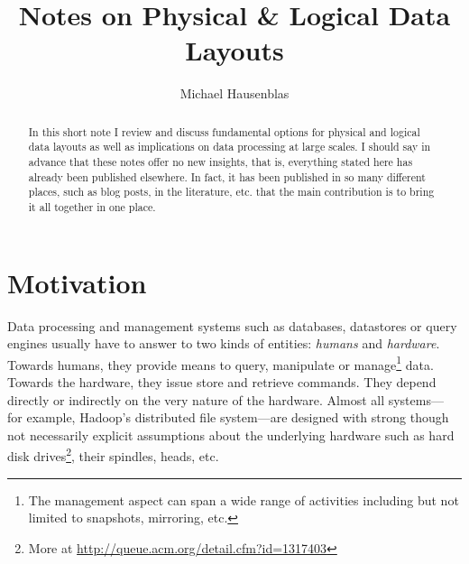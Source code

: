 \documentclass{llncs}
\begin{document}
\title{Notes on Physical \& Logical Data Layouts}
	\author{
	Michael Hausenblas 
	}
\maketitle

\begin{abstract}
In this short note I review and discuss fundamental options for physical and
logical data layouts as well as implications on data processing at large scales.
I should say in advance that these notes offer no new insights, that is, 
everything stated here has already been published elsewhere. In fact, it has
been published in so many different places, such as blog posts, in the 
literature, etc. that the main contribution is to bring it all together in one
place.
\end{abstract}

\section{Motivation}
\label{sec:mot}
Data processing and management systems such as databases, datastores or query 
engines usually have to answer to two kinds of entities: \emph{humans} and 
\emph{hardware}. 
Towards humans, they provide means to query, manipulate or 
manage\footnote{The management aspect can span a wide range of activities 
including but not limited to snapshots, mirroring, etc.} data.
Towards the hardware, they issue store and retrieve commands. They depend 
directly or indirectly on the very nature of the hardware. Almost all systems---
for example, Hadoop's distributed file system---are designed with strong though
not necessarily explicit assumptions about the underlying hardware such as hard 
disk drives\footnote{More at \url{http://queue.acm.org/detail.cfm?id=1317403}}, 
their spindles, heads, etc.
\end{document}
